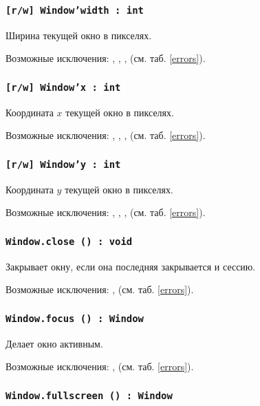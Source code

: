 \subsubsection{\texttt{[r/w] Window'width : int}}

Ширина текущей окно в пикселях.

Возможные исключения: , , ,  (см. таб. \ref{errors}).

\subsubsection{\texttt{[r/w] Window'x : int}}

Координата $x$ текущей окно в пикселях.

Возможные исключения: , , ,  (см. таб. \ref{errors}).

\subsubsection{\texttt{[r/w] Window'y : int}}

Координата $y$ текущей окно в пикселях.

Возможные исключения: , , ,  (см. таб. \ref{errors}).

\subsubsection{\texttt{Window.close () : void}}

Закрывает окну, если она последняя закрывается и сессию.

Возможные исключения: ,  (см. таб. \ref{errors}).

\subsubsection{\texttt{Window.focus () : Window}}

Делает окно активным.

Возможные исключения: ,  (см. таб. \ref{errors}).

\subsubsection{\texttt{Window.fullscreen () : Window}}

